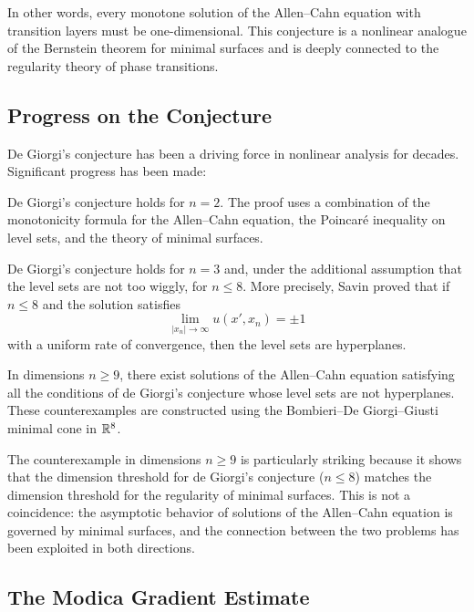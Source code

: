 In other words, every monotone solution of the Allen--Cahn equation with transition layers must be one-dimensional. This conjecture is a nonlinear analogue of the Bernstein theorem for minimal surfaces and is deeply connected to the regularity theory of phase transitions.

\subsection{Progress on the Conjecture}

De Giorgi's conjecture has been a driving force in nonlinear analysis for decades. Significant progress has been made:

\begin{theorem}
De Giorgi's conjecture holds for \(n = 2\). The proof uses a combination of the monotonicity formula for the Allen--Cahn equation, the Poincar\'e inequality on level sets, and the theory of minimal surfaces.
\end{theorem}

\begin{theorem}[Savin, 2004]
De Giorgi's conjecture holds for \(n = 3\) and, under the additional assumption that the level sets are not too wiggly, for \(n \leq 8\). More precisely, Savin proved that if \(n \leq 8\) and the solution satisfies
\[
\lim_{|x_n| \to \infty} u(x',x_n) = \pm 1
\]
with a uniform rate of convergence, then the level sets are hyperplanes.
\end{theorem}

\begin{theorem}
In dimensions \(n \geq 9\), there exist solutions of the Allen--Cahn equation satisfying all the conditions of de Giorgi's conjecture whose level sets are not hyperplanes. These counterexamples are constructed using the Bombieri--De Giorgi--Giusti minimal cone in \(\mathbb{R}^8\).
\end{theorem}

The counterexample in dimensions \(n \geq 9\) is particularly striking because it shows that the dimension threshold for de Giorgi's conjecture (\(n \leq 8\)) matches the dimension threshold for the regularity of minimal surfaces. This is not a coincidence: the asymptotic behavior of solutions of the Allen--Cahn equation is governed by minimal surfaces, and the connection between the two problems has been exploited in both directions.

\subsection{The Modica Gradient Estimate}

